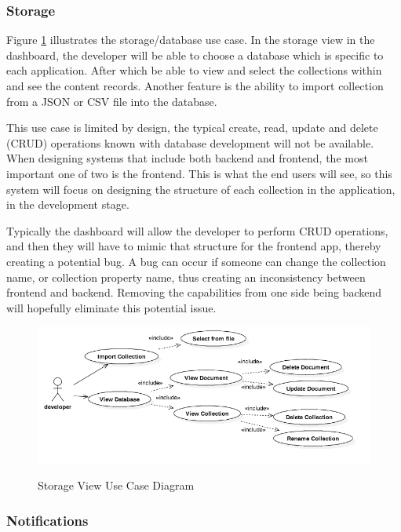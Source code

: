\subsubsection{Storage} \label{d-db:storage}

Figure \ref{fig:storage_use_case} illustrates the storage/database use case. In the storage view in the dashboard, the developer will be able to choose a database which is specific to each application. After which be able to view and select the collections within and see the content records. Another feature is the ability to import collection from a JSON or CSV file into the database.

This use case is limited by design, the typical create, read, update and delete (CRUD) operations known with database development will not be available. When designing systems that include both backend and frontend, the most important one of two is the frontend. This is what the end users will see, so this system will focus on designing the structure of each collection in the application, in the development stage. 

Typically the dashboard will allow the developer to perform CRUD operations, and then they will have to mimic that structure for the frontend app, thereby creating a potential bug. A bug can occur if someone can change the collection name, or collection property name, thus creating an inconsistency between frontend and backend. Removing the capabilities from one side being backend will hopefully eliminate this potential issue.

\begin{figure}[!h]
    \caption{Storage View Use Case Diagram}
    \centering
    \includegraphics[width=120mm]{images/use_cases/storage_use_case}
    \label{fig:storage_use_case}
\end{figure}

\subsubsection{Notifications} \label{d-db:notifications}

